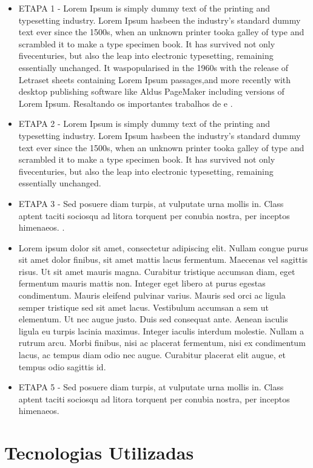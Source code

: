 \documentclass[
	12pt,				%
	openright,			%
	oneside,			%
	a4paper,			%
	chapter=TITLE,		%
	english,			%
	brazil,				%
	]{abntex2}
\begin{document}
\begin{itemize}
\item ETAPA 1 - Lorem Ipsum is simply dummy text of the printing and typesetting industry. Lorem Ipsum hasbeen the industry’s standard dummy text ever since the 1500s, when an unknown printer tooka galley of type and scrambled it to make a type specimen book. It has survived not only fivecenturies, but also the leap into electronic typesetting, remaining essentially unchanged. It waspopularised in the 1960s with the release of Letraset sheets containing Lorem Ipsum passages,and more recently with desktop publishing software like Aldus PageMaker including versions of Lorem Ipsum. Resaltando os importantes trabalhos de \cite{ghareeb2008multiple} e \cite{afzal2019holistic}.
\item ETAPA 2 - Lorem Ipsum is simply dummy text of the printing and typesetting industry. Lorem Ipsum hasbeen the industry’s standard dummy text ever since the 1500s, when an unknown printer tooka galley of type and scrambled it to make a type specimen book. It has survived not only fivecenturies, but also the leap into electronic typesetting, remaining essentially unchanged. 
\item ETAPA 3 - Sed posuere diam turpis, at vulputate urna mollis in. Class aptent taciti sociosqu ad litora torquent per conubia nostra, per inceptos himenaeos. .
\item Lorem ipsum dolor sit amet, consectetur adipiscing elit. Nullam congue purus sit amet dolor finibus, sit amet mattis lacus fermentum. Maecenas vel sagittis risus. Ut sit amet mauris magna. Curabitur tristique accumsan diam, eget fermentum mauris mattis non. Integer eget libero at purus egestas condimentum. Mauris eleifend pulvinar varius. Mauris sed orci ac ligula semper tristique sed sit amet lacus. Vestibulum accumsan a sem ut elementum. Ut nec augue justo. Duis sed consequat ante. Aenean iaculis ligula eu turpis lacinia maximus. Integer iaculis interdum molestie. Nullam a rutrum arcu. Morbi finibus, nisi ac placerat fermentum, nisi ex condimentum lacus, ac tempus diam odio nec augue. Curabitur placerat elit augue, et tempus odio sagittis id.
\item ETAPA 5 - Sed posuere diam turpis, at vulputate urna mollis in. Class aptent taciti sociosqu ad litora torquent per conubia nostra, per inceptos himenaeos.
\end{itemize}

\section{Tecnologias Utilizadas}
\end{document}
